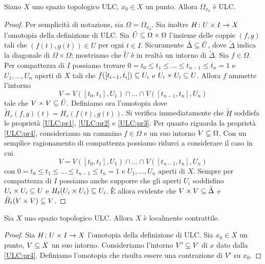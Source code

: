 \begin{proposition}
Siano $X$ uno spazio topologico ULC, $x_0\in X$ un punto. Allora $\Omega_{x_0}$ è ULC.
\end{proposition}
\begin{proof}
Per semplicità di notazione, sia $\Omega=\Omega_{x_0}$. Sia inoltre $H\colon U\times I\to X$ l'omotopia della definizione di ULC. Sia $\tilde{U}\subseteq\Omega\times\Omega$ l'insieme delle coppie $(f,g)$ tali che $(f(t),g(t))\in U$ per ogni $t\in I$. Sicuramente $\tilde\Delta\subseteq\tilde U$, dove $\tilde\Delta$ indica la diagonale di $\Omega\times\Omega$; mostriamo che $\tilde U$ è in realtà un intorno di $\tilde\Delta$. Sia $f\in\Omega$. Per compattezza di $I$ possiamo trovare $0=t_0\le t_1\le\ldots\le t_{n-1}\le t_n=1$ e $U_1,\ldots,U_n$ aperti di $X$ tali che $f([t_{i-1},t_i])\subseteq U_i$ e $U_i\times U_i\subseteq U$. Allora $f$ ammette l'intorno
$$
V=V([t_0,t_1],U_1)\cap\ldots\cap V([t_{n-1},t_n],U_n)
$$
tale che $V\times V\subseteq\tilde{U}$. Definiamo ora l'omotopia
dove $\tilde{H}_s(f,g)(t)=H_s(f(t),g(t))$. Si verifica immediatamente che $\tilde{H}$ soddisfa le proprietà \ref{ULC:pr1}, \ref{ULC:pr2} e \ref{ULC:pr3}. Per quanto riguarda la proprietà \ref{ULC:pr4}, consideriamo un cammino $f\in\Omega$ e un suo intorno $V\subseteq\Omega$. Con un semplice ragionamento di compattezza possiamo ridurci a considerare il caso in cui
$$
V=V([t_0,t_1],U_1)\cap\ldots\cap V([t_{n-1},t_n],U_n)
$$
con $0=t_0\le t_1\le\ldots\le t_{n-1}\le t_n=1$ e $U_1,\ldots,U_n$ aperti di $X$. Sempre per compattezza di $I$ possiamo anche supporre che gli aperti $U_i$ soddisfino $U_i\times U_i\subseteq U$ e $H_t(U_i\times U_i)\subseteq U_i$. È allora evidente che $V\times V\subseteq\tilde\Delta$ e $\tilde{H}_t(V\times V)\subseteq V$.
\end{proof}

\begin{proposition}
Sia $X$ uno spazio topologico ULC. Allora $X$ è localmente contrattile.
\end{proposition}
\begin{proof}
Sia $H\colon U\times I\to X$ l'omotopia della definizione di ULC. Sia $x_0\in X$ un punto, $V\subseteq X$ un suo intorno. Consideriamo l'intorno $V'\subseteq V$ di $x$ dato dalla \ref{ULC:pr4}. Definiamo l'omotopia
che risulta essere una contrazione di $V'$ su $x_0$.
\end{proof}

